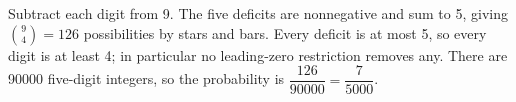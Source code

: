 Subtract each digit from 9. The five deficits are nonnegative and sum to 5, giving $\binom94=126$ possibilities by stars and bars. Every deficit is at most 5, so every digit is at least 4; in particular no leading-zero restriction removes any. There are 90000 five-digit integers, so the probability is $\dfrac{126}{90000}=\boxed{\dfrac{7}{5000}}$.

